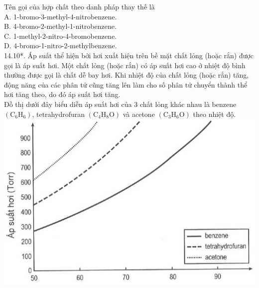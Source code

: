 \documentclass[10pt]{article}
\begin{document}
Tên gọi của hợp chất theo danh pháp thay thế là\\
A. 1-bromo-3-methyl-4-nitrobenzene.\\
B. 4-bromo-2-methyl-1-nitrobenzene.\\
C. 1-methyl-2-nitro-4-bromobenzene.\\
D. 4-bromo-1-nitro-2-methylbenzene.\\
14.10*. Áp suất thể hiện bởi hơi xuất hiện trên bề mặt chất lỏng (hoặc rắn) được gọi là áp suất hơi. Một chất lỏng (hoặc rắn) có áp suất hơi cao ở nhiệt độ bình thường được gọi là chất dễ bay hơi. Khi nhiệt độ của chất lỏng (hoặc rắn) tăng, động năng của các phân tử cũng tăng lên làm cho số phân tử chuyển thành thể hơi tăng theo, do đó áp suất hơi tăng.\\
Đồ thị dưới đây biểu diễn áp suất hơi của 3 chất lỏng khác nhau là benzene $\left(\mathrm{C}_{6} \mathrm{H}_{6}\right)$, tetrahydrofuran $\left(\mathrm{C}_{4} \mathrm{H}_{8} \mathrm{O}\right)$ và acetone $\left(\mathrm{C}_{3} \mathrm{H}_{6} \mathrm{O}\right)$ theo nhiệt độ.\\
\includegraphics[max width=\textwidth, center]{2025_10_23_ae7aef68fb3b41082d29g-29(1)}
\end{document}
